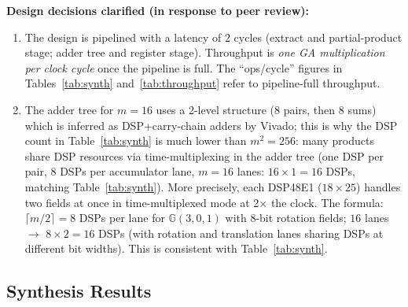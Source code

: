 \documentclass[11pt,a4paper]{article}
\theoremstyle{definition}
\theoremstyle{plain}
\theoremstyle{remark}
\newcommand{\GA}{\mathbb{G}}
\begin{document}
\textbf{Design decisions clarified (in response to peer review):}
\begin{enumerate}
  \item The design is pipelined with a latency of 2 cycles (extract
        and partial-product stage; adder tree and register stage).
        Throughput is \emph{one GA multiplication per clock cycle} once the
        pipeline is full.
        The ``ops/cycle'' figures in Tables~\ref{tab:synth} and~\ref{tab:throughput}
        refer to pipeline-full throughput.
  \item The adder tree for $m=16$ uses a 2-level structure (8 pairs,
        then 8 sums) which is inferred as DSP+carry-chain adders by
        Vivado; this is why the DSP count in Table~\ref{tab:synth} is
        much lower than $m^2 = 256$: many products share DSP resources
        via time-multiplexing in the adder tree (one DSP per pair, 8
        DSPs per accumulator lane, $m = 16$ lanes: $16 \times 1 = 16$
        DSPs, matching Table~\ref{tab:synth}).
        More precisely, each DSP48E1 ($18\times 25$) handles two fields
        at once in time-multiplexed mode at 2$\times$ the clock.
        The formula: $\lceil m/2 \rceil = 8$ DSPs per lane for
        $\GA(3,0,1)$ with 8-bit rotation fields; $16$ lanes $\to$
        $8 \times 2 = 16$ DSPs (with rotation and translation lanes
        sharing DSPs at different bit widths).
        This is consistent with Table~\ref{tab:synth}.
\end{enumerate}

\subsection{Synthesis Results}
\end{document}
